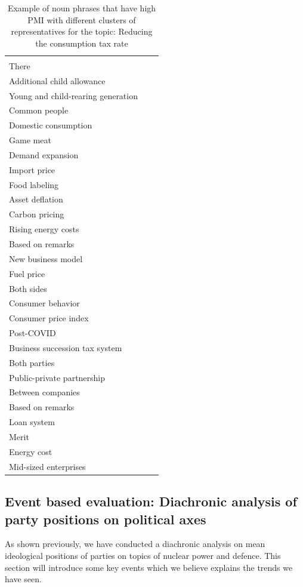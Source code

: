\documentclass[final,5p,times,twocolumn,authoryear]{elsarticle}
\begin{document}
\begin{table}[htbp]
\begin{tabularx}{\textwidth}{|>{\centering\arraybackslash}X|>{\centering\arraybackslash}X|>{\centering\arraybackslash}X|}
\begin{tabular}[c]{@{}l@{}}
	Animal welfare \\ There \\ Additional child allowance \\ Young and child-rearing generation \\ Common people \\ Domestic consumption \\ Game meat \\ Demand expansion \\ Import price \\ Food labeling \\ Asset deflation \\ Carbon pricing \\ Rising energy costs \\ Based on remarks \\ New business model \\ Fuel price \\ Both sides \\ Consumer behavior \\ Consumer price index \\ Post-COVID \\ Business succession tax system \\ Both parties \\ Public-private partnership \\ Between companies \\ Based on remarks \\ Loan system \\ Merit \\ Energy cost \\ Mid-sized enterprises
\end{tabular} \\ \hline
\end{tabularx}
\caption{Example of noun phrases that have high PMI with different clusters of representatives for the topic: Reducing the consumption tax rate}
\label{table:PMI-taxrate}
\end{table}
\FloatBarrier

\subsection{Event based evaluation: Diachronic analysis of party positions on political axes}
\label{section: event-based}
As shown previously, we have conducted a diachronic analysis on mean ideological positions of parties on topics of nuclear power and defence. This section will introduce some key events which we believe explains the trends we have seen. 
\end{document}
